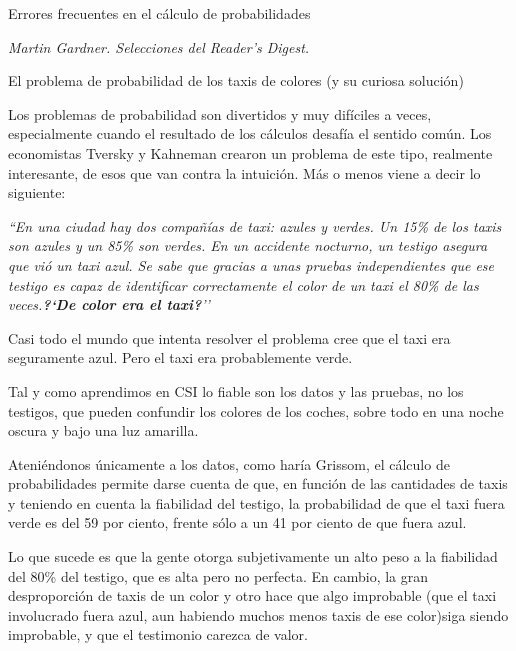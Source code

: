 \begin{myexampleblock} {Errores frecuentes en el cálculo de probabilidades}
\begin{flushright}
	 \textit{Martin Gardner. Selecciones del Reader’s Digest.}
\end{flushright}

\end{myexampleblock}


\vspace{5mm}	
\begin{myexampleblock} {El problema de probabilidad de los taxis de colores (y su curiosa solución)}


\vspace{2mm}Los problemas de probabilidad son divertidos y muy difíciles a veces, especialmente cuando el resultado de los cálculos desafía el sentido común. Los economistas Tversky y Kahneman crearon un problema de este tipo, realmente interesante, de esos que van contra la intuición. Más o menos viene a decir lo siguiente:

\vspace{2mm}\emph{``En una ciudad hay dos compañías de taxi: azules y verdes. Un 15\% de los taxis son azules y un 85\% son verdes. En un accidente nocturno, un testigo asegura que vió un taxi azul. Se sabe que gracias a unas pruebas independientes que ese testigo es capaz de identificar correctamente el color de un taxi el 80\% de las veces.\textbf{?`De color era el taxi?}’'}


\vspace{2mm}Casi todo el mundo que intenta resolver el problema cree que el taxi era seguramente azul. Pero el taxi era probablemente verde.

\vspace{2mm}Tal y como aprendimos en CSI lo fiable son los datos y las pruebas, no los testigos, que pueden confundir los colores de los coches, sobre todo en una noche oscura y bajo una luz amarilla.

\vspace{2mm}Ateniéndonos únicamente a los datos, como haría Grissom, el cálculo de probabilidades permite darse cuenta de que, en función de las cantidades de taxis y teniendo en cuenta la fiabilidad del testigo, la probabilidad de que el taxi fuera verde es del 59 por ciento, frente sólo a un 41 por ciento de que fuera azul.

\vspace{2mm}Lo que sucede es que la gente otorga subjetivamente un alto peso a la fiabilidad del 80\% del testigo, que es alta pero no perfecta. En cambio, la gran desproporción de taxis de un color y otro hace que algo improbable (que el taxi involucrado fuera azul, aun habiendo muchos menos taxis de ese color)siga siendo improbable, y que el testimonio carezca de valor.


\end{myexampleblock}
